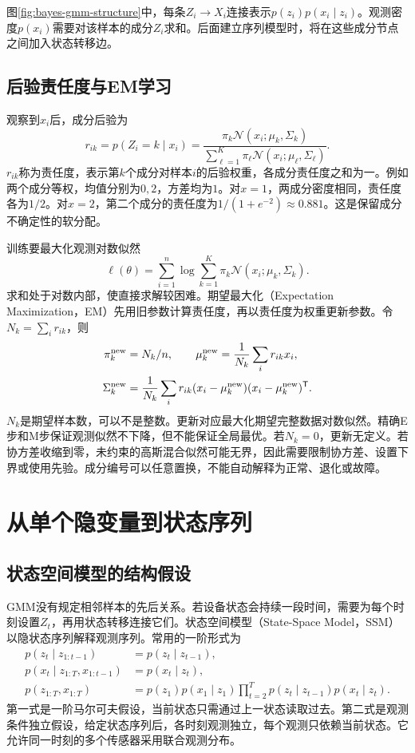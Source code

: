 图\ref{fig:bayes-gmm-structure}中，每条$Z_i\to X_i$连接表示$p(z_i)p(x_i\mid z_i)$。观测密度$p(x_i)$需要对该样本的成分$Z_i$求和。后面建立序列模型时，将在这些成分节点之间加入状态转移边。

\subsection{后验责任度与EM学习}
观察到$x_i$后，成分后验为
\begin{equation}
 r_{ik}=p(Z_i=k\mid x_i)
 =\frac{\pi_k\mathcal N(x_i;\mu_k,\Sigma_k)}
 {\sum_{\ell=1}^K\pi_\ell\mathcal N(x_i;\mu_\ell,\Sigma_\ell)}.
 \label{eq:bayes-gmm-responsibility}
\end{equation}
$r_{ik}$称为责任度，表示第$k$个成分对样本$i$的后验权重，各成分责任度之和为一。例如两个成分等权，均值分别为$0,2$，方差均为$1$。对$x=1$，两成分密度相同，责任度各为$1/2$。对$x=2$，第二个成分的责任度为$1/(1+e^{-2})\approx0.881$。这是保留成分不确定性的软分配。

训练要最大化观测对数似然
\begin{equation}
 \ell(\theta)=\sum_{i=1}^n\log\sum_{k=1}^K\pi_k\mathcal N(x_i;\mu_k,\Sigma_k).
\end{equation}
求和处于对数内部，使直接求解较困难。期望最大化（Expectation Maximization，EM）先用旧参数计算责任度，再以责任度为权重更新参数。令$N_k=\sum_i r_{ik}$，则
\begin{align}
 \pi_k^{\rm new}&=N_k/n,\qquad
 \mu_k^{\rm new}=\frac{1}{N_k}\sum_i r_{ik}x_i,\\
 \Sigma_k^{\rm new}&=\frac{1}{N_k}\sum_i r_{ik}
 (x_i-\mu_k^{\rm new})(x_i-\mu_k^{\rm new})^{\mathsf T}.
\end{align}
$N_k$是期望样本数，可以不是整数。更新对应最大化期望完整数据对数似然。精确E步和M步保证观测似然不下降，但不能保证全局最优。若$N_k=0$，更新无定义。若协方差收缩到零，未约束的高斯混合似然可能无界，因此需要限制协方差、设置下界或使用先验。成分编号可以任意置换，不能自动解释为正常、退化或故障。

\section{从单个隐变量到状态序列}
\subsection{状态空间模型的结构假设}
GMM没有规定相邻样本的先后关系。若设备状态会持续一段时间，需要为每个时刻设置$Z_t$，再用状态转移连接它们。状态空间模型（State-Space Model，SSM）以隐状态序列解释观测序列。常用的一阶形式为
\begin{align}
 p(z_t\mid z_{1:t-1})&=p(z_t\mid z_{t-1}),\\
 p(x_t\mid z_{1:T},x_{1:t-1})&=p(x_t\mid z_t),\\
 p(z_{1:T},x_{1:T})&=p(z_1)p(x_1\mid z_1)
 \prod_{t=2}^T p(z_t\mid z_{t-1})p(x_t\mid z_t).
 \label{eq:bayes-ssm-joint}
\end{align}
第一式是一阶马尔可夫假设，当前状态只需通过上一状态读取过去。第二式是观测条件独立假设，给定状态序列后，各时刻观测独立，每个观测只依赖当前状态。它允许同一时刻的多个传感器采用联合观测分布。

